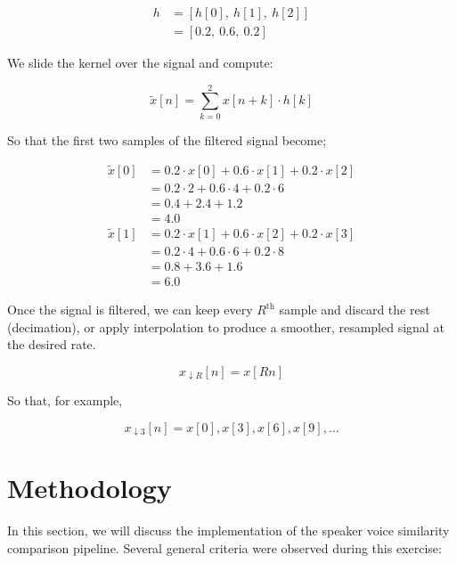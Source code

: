 \documentclass[conference]{IEEEtran}
\begin{document}
	\begin{align*}
		h &= [h[0],\ h[1],\ h[2]]\\
		&= [0.2,\ 0.6,\ 0.2]
	\end{align*}
	
	We slide the kernel over the signal and compute:
	
	$$\tilde{x}[n] = \sum_{k=0}^{2} x[n + k] \cdot h[k]$$
	
	So that the first two samples of the filtered signal become;
	
	\begin{align*}
		\tilde{x}[0]	&= 0.2 \cdot x[0] + 0.6 \cdot x[1] + 0.2 \cdot x[2] \\
		&= 0.2\cdot2 + 0.6\cdot4 + 0.2\cdot6 \\
		&= 0.4 + 2.4 + 1.2 \\
		&= 4.0\\
		\tilde{x}[1] 	&= 0.2 \cdot x[1] + 0.6 \cdot x[2] + 0.2 \cdot x[3] \\
		&= 0.2\cdot4 + 0.6\cdot6 + 0.2\cdot8 \\
		&= 0.8 + 3.6 + 1.6 \\
		&= 6.0
	\end{align*}
	
	Once the signal is filtered, we can keep every $R^\text{th}$ sample and discard the rest (decimation), or apply interpolation to produce a smoother, resampled signal at the desired rate.
	
	$$x_{\downarrow R}[n] = x[Rn]$$
	
	So that, for example,
	
	$$x_{\downarrow 3}[n] = x[0], x[3], x[6], x[9], \dots$$
	
	\section{Methodology}
	
	In this section, we will discuss the implementation of the speaker voice similarity comparison pipeline. Several general criteria were observed during this exercise:
	
\end{document}
